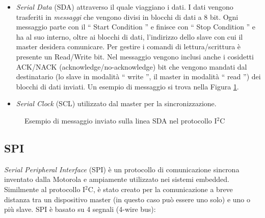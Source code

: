 \documentclass[12pt]{report}
\begin{document}
\begin{itemize}
	\item \emph{Serial Data} (SDA) attraverso il quale viaggiano i dati. I dati vengono trasferiti in \textit{messaggi} che vengono divisi in blocchi di dati a 8 bit. Ogni messaggio parte con il \textquotedblleft{} Start Condition \textquotedblright{} e finisce con \textquotedblleft{} Stop Condition \textquotedblright{} e ha al suo interno, oltre ai blocchi di dati, l'indirizzo dello slave con cui il master desidera comunicare. Per gestire i comandi di lettura/scrittura è presente un Read/Write bit. Nel messaggio vengono inclusi anche i cosidetti ACK/NACK (acknowledge/no-acknowledge) bit che vengono mandati dal destinatario (lo slave in modalità \textquotedblleft{} write \textquotedblright{}, il master in modalità \textquotedblleft{} read \textquotedblright{}) dei blocchi di dati inviati. Un esempio di messaggio si trova nella Figura \ref{fig:i2c_data_bus}. 
	\item \emph{Serial Clock} (SCL) utilizzato dal master per la sincronizzazione.
\end{itemize}

\begin{figure}[H]
	\caption{Esempio di messaggio inviato sulla linea SDA nel protocollo I$^2$C }
	\label{fig:i2c_data_bus}
\end{figure}


%
\subsection{SPI}\label{sec:spi}
% 

\emph{Serial Peripheral Interface} (SPI) è un protocollo di comunicazione sincrona inventato dalla Motorola e ampiamente utilizzato nei sistemi embedded. Similmente al protocollo I$^2$C, è stato creato per la comunicazione a breve distanza tra un dispositivo master (in questo caso può essere uno solo) e uno o più slave.
SPI è basato su 4 segnali (4-wire bus):
\end{document}
